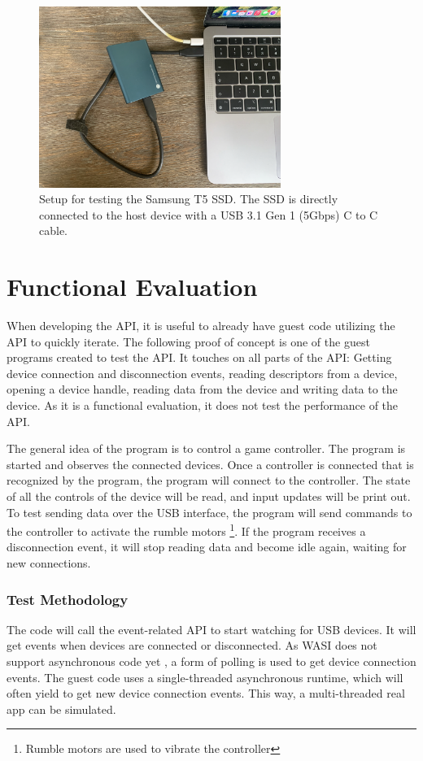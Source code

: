 \begin{figure}[H]
  \centering
  \includegraphics[width=0.7\textwidth]{images/t5_setup.png}
  \caption{Setup for testing the Samsung T5 SSD. The SSD is directly connected to the host device with a USB 3.1 Gen 1 (5Gbps) C to C cable.}
  \label{fig:samsung_setup}
\end{figure}




\section{Functional Evaluation}
\label{section:functional_evaluation}
When developing the API, it is useful to already have guest code utilizing the API to quickly iterate. The following proof of concept is one of the guest programs created to test the API. It touches on all parts of the API: Getting device connection and disconnection events, reading descriptors from a device, opening a device handle, reading data from the device and writing data to the device. As it is a functional evaluation, it does not test the performance of the API.

The general idea of the program is to control a game controller. The program is started and observes the connected devices. Once a controller is connected that is recognized by the program, the program will connect to the controller. The state of all the controls of the device will be read, and input updates will be print out. To test sending data over the USB interface, the program will send commands to the controller to activate the rumble motors \footnote{Rumble motors are used to vibrate the controller}. If the program receives a disconnection event, it will stop reading data and become idle again, waiting for new connections.

\subsubsection{Test Methodology}
The code will call the event-related API to start watching for USB devices. It will get events when devices are connected or disconnected. As WASI does not support asynchronous code yet \cite{wasi_roadmap}, a form of polling is used to get device connection events. The guest code uses a single-threaded asynchronous runtime, which will often yield to get new device connection events. This way, a multi-threaded real app can be simulated.

